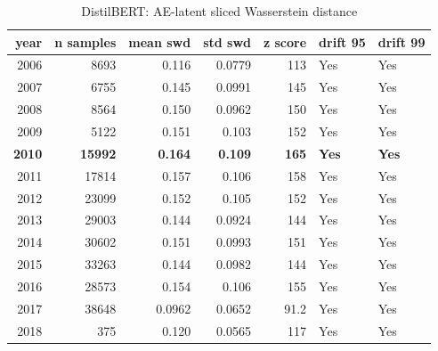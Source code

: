 \begin{table}[ht]
\centering
\caption{DistilBERT: AE-latent sliced Wasserstein distance}
\label{tab:distilbert_latent_swd}
\begin{tabular}{rrrrrll}
\toprule
year & n samples & mean swd & std swd & z score & drift 95 & drift 99 \\
\midrule
2006 & 8693 & 0.116 & 0.0779 & 113 & Yes & Yes \\
2007 & 6755 & 0.145 & 0.0991 & 145 & Yes & Yes \\
2008 & 8564 & 0.150 & 0.0962 & 150 & Yes & Yes \\
2009 & 5122 & 0.151 & 0.103 & 152 & Yes & Yes \\
\textbf{2010} & \textbf{15992} & \textbf{0.164} & \textbf{0.109} & \textbf{165} & \textbf{Yes} & \textbf{Yes} \\
2011 & 17814 & 0.157 & 0.106 & 158 & Yes & Yes \\
2012 & 23099 & 0.152 & 0.105 & 152 & Yes & Yes \\
2013 & 29003 & 0.144 & 0.0924 & 144 & Yes & Yes \\
2014 & 30602 & 0.151 & 0.0993 & 151 & Yes & Yes \\
2015 & 33263 & 0.144 & 0.0982 & 144 & Yes & Yes \\
2016 & 28573 & 0.154 & 0.106 & 155 & Yes & Yes \\
2017 & 38648 & 0.0962 & 0.0652 & 91.2 & Yes & Yes \\
2018 & 375 & 0.120 & 0.0565 & 117 & Yes & Yes \\
\bottomrule
\end{tabular}
\end{table}
